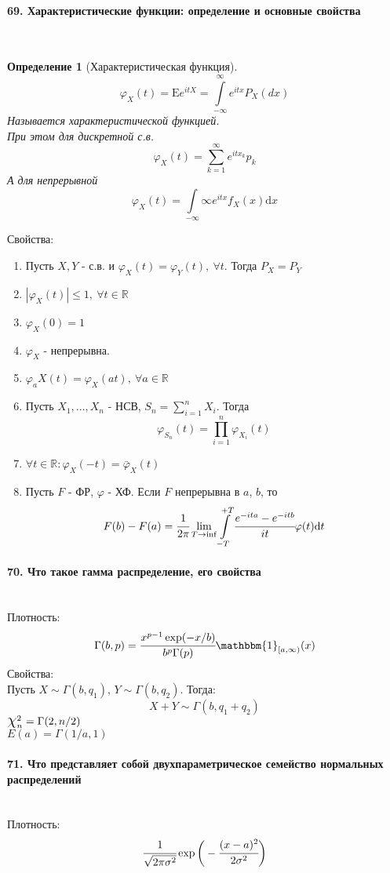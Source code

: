 \documentclass[titlepage]{article}
\newcommand{\sE}{\mathrm{E}}
\newcommand{\sN}{\mathrm{N}} %
\newcommand{\R}{\mathbb{R}} %
\newcommand*{\bigchi}{\mbox{\Large$\chi$}} %
\newtheorem{definition}{Определение}
\begin{document}
\paragraph{69. Характеристические функции: определение и основные свойства} ~\\
\begin{definition}[Характеристическая функция]
	\[\varphi_X(t)=\sE e^{itX} = \int\limits_{-\infty}^\infty e^{itx}P_X(dx)\]
	Называется характеристической функцией.\\
	При этом для дискретной с.в.
	\[\varphi_X(t)=\sum_{k=1}^\infty e^{itx_k}p_k\]
	А для непрерывной
	\[\varphi_X(t)=\int\limits_{-\infty}{\infty}e^{itx}f_X(x)\mathrm{d}x\]
\end{definition}
Свойства:
\begin{enumerate}
	\item Пусть $X, Y$ - с.в. и $\varphi_X(t)=\varphi_Y(t),\ \forall t$. Тогда $P_X = P_Y$
	\item $|\varphi_X(t)|\leq 1,\ \forall t \in \R$
	\item $\varphi_X(0) = 1$
	\item $\varphi_X$ - непрерывна.
	\item $\varphi_aX(t) = \varphi_X(at),\ \forall a \in \R$
	\item Пусть $X_1,\dots,X_n$ - НСВ, $S_n = \sum_{i=1}^nX_i$. Тогда
	\[\varphi_{S_n}(t)=\prod_{i=1}^n\varphi_{X_i}(t)\]
	\item $\forall t \in \R: \varphi_X(-t)=\bar\varphi_X(t)$
	\item Пусть $F$ - ФР, $\varphi$ - ХФ. Если $F$ непрерывна в $a$, $b$, то
	\[F(b)-F(a)=\cfrac{1}{2\pi}\lim_{T\rightarrow\inf}\int\limits_{-T}^{+T}\cfrac{e^{-ita}-e^{-itb}}{it}\varphi(t)\mathrm{d}t\]
\end{enumerate}

\paragraph{70. Что такое гамма распределение, его свойства} ~\\
Плотность:
\[\Gamma(b,p) = \cfrac{x^{p-1}\exp(-x/b)}{b^p\Gamma(p)}\mathbbm{1}_{[a,\infty)}(x)\]
Свойства:\\
Пусть $X \sim \Gamma(b,q_1)$, $Y \sim \Gamma(b,q_2)$. Тогда:
\[X + Y \sim \Gamma(b,q_1+q_2)\]
$\bigchi_n^2 = \Gamma(2,n/2)$\\
$E(a) = \Gamma(1/a,1)$

\paragraph{71. Что представляет собой двухпараметрическое семейство нормальных распределений} ~\\
Плотность:\\
\[\cfrac{1}{\sqrt{2\pi\sigma^2}}\exp\bigg(-\cfrac{(x-a)^2}{2\sigma^2}\bigg)\]
\end{document}
